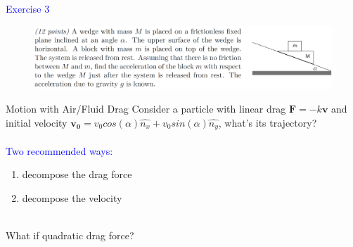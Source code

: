 \documentclass{beamer}
\begin{document}
\begin{frame}
\textcolor{blue}{Exercise 3}

\begin{figure}[htbp]
\centering
\includegraphics[width=1 \linewidth, angle =0]{ex3.png}
\label{fig:3}
\end{figure}
\end{frame}

\begin{frame}{Motion with Air/Fluid Drag}
  Consider a particle with linear drag $\mathbf{F} = -k\mathbf{v}$ and initial velocity $\mathbf{v_0} = v_0cos(\alpha)\hat{n_x} + v_0sin(\alpha)\hat{n_y}$, what's its trajectory? \\
  ~\\
  \textcolor{blue}{Two recommended ways:}\\
  \begin{enumerate}
    \item decompose the drag force
    \item decompose the velocity
  \end{enumerate}
  ~\\
  What if quadratic drag force?
\end{frame}
\end{document}
